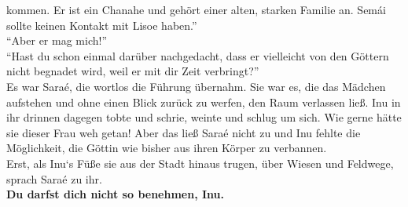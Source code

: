 \documentclass[a4paper,12pt]{book}
\begin{document}
kommen. Er ist ein Chanahe und gehört einer alten, starken Familie an. Semái sollte keinen Kontakt 
mit Lisoe haben.''\\
``Aber er mag mich!''\\
``Hast du schon einmal darüber nachgedacht, dass er vielleicht von den Göttern nicht begnadet wird, 
weil er mit dir Zeit verbringt?''\\
Es war Saraé, die wortlos die Führung übernahm. Sie war es, die das Mädchen aufstehen und ohne 
einen Blick zurück zu werfen, den Raum verlassen ließ. Inu in ihr drinnen dagegen tobte und schrie, 
weinte und schlug um sich. Wie gerne hätte sie dieser Frau weh getan! Aber das ließ Saraé nicht zu 
und Inu fehlte die Möglichkeit, die Göttin wie bisher aus ihren Körper zu verbannen. \\
Erst, als Inu‘s Füße sie aus der Stadt hinaus trugen, über Wiesen und Feldwege, sprach Saraé zu 
ihr.\\
\textbf{Du darfst dich nicht so benehmen, Inu.}\\
\end{document}

